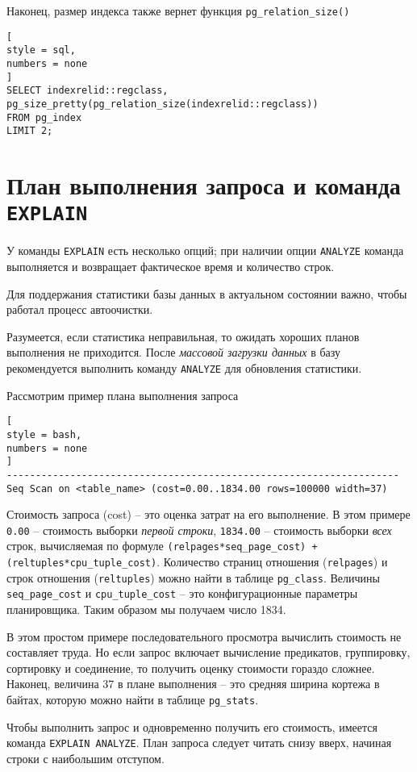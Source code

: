 \documentclass[%
	11pt,
	a4paper,
	utf8,
		]{article}
\begin{document}
Наконец, размер индекса также вернет функция \texttt{pg\_relation\_size()}
\begin{lstlisting}[
style = sql,
numbers = none
]
SELECT indexrelid::regclass, pg_size_pretty(pg_relation_size(indexrelid::regclass))
FROM pg_index
LIMIT 2;
\end{lstlisting}

\section{План выполнения запроса и команда \texttt{EXPLAIN}}

У команды \texttt{EXPLAIN} есть несколько опций; при наличии опции \texttt{ANALYZE} команда выполняется и возвращает фактическое время и количество строк.

Для поддержания статистики базы данных в актуальном состоянии важно, чтобы работал процесс автоочистки.

Разумеется, если статистика неправильная, то ожидать хороших планов выполнения не приходится. После \emph{массовой загрузки данных} в базу рекомендуется выполнить команду \texttt{ANALYZE} для обновления статистики. 

Рассмотрим пример плана выполнения запроса
\begin{lstlisting}[
style = bash,
numbers = none
]
--------------------------------------------------------------------
Seq Scan on <table_name> (cost=0.00..1834.00 rows=100000 width=37)
\end{lstlisting}

Стоимость запроса (cost) -- это оценка затрат на его выполнение. В этом примере \texttt{0.00} -- стоимость выборки \emph{первой строки}, \texttt{1834.00} -- стоимость выборки \emph{всех} строк, вычисляемая по формуле \texttt{(relpages*seq\_page\_cost) + (reltuples*cpu\_tuple\_cost)}. Количество страниц отношения (\texttt{relpages}) и строк отношения (\texttt{reltuples}) можно найти в таблице \texttt{pg\_class}. Величины \texttt{seq\_page\_cost} и \texttt{cpu\_tuple\_cost} -- это конфигурационные параметры планировщика. Таким образом мы получаем число 1834.

В этом простом примере последовательного просмотра вычислить стоимость не составляет труда. Но если запрос включает вычисление предикатов, группировку, сортировку и соединение, то получить оценку стоимости гораздо сложнее. Наконец, величина 37 в плане выполнения -- это средняя ширина кортежа в байтах, которую можно найти в таблице \texttt{pg\_stats}. 

Чтобы выполнить запрос и одновременно получить его стоимость, имеется команда \texttt{EXPLAIN ANALYZE}. План запроса следует читать снизу вверх, начиная строки с наибольшим отступом.
\end{document}
